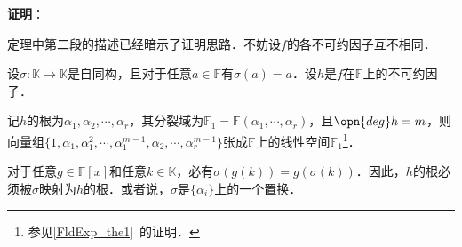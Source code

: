 \textbf{证明}：

定理中第二段的描述已经暗示了证明思路．不妨设$f$的各不可约因子互不相同．

设$\sigma:\mathbb{K}\to\mathbb{K}$是自同构，且对于任意$a\in\mathbb{F}$有$\sigma(a)=a$．设$h$是$f$在$\mathbb{F}$上的不可约因子．

记$h$的根为$\alpha_1, \alpha_2, \cdots, \alpha_r$，其分裂域为$\mathbb{F}_1=\mathbb{F}(\alpha_1,\cdots,\alpha_r)$，且$\opn{deg}h=m$，则向量组$\{1, \alpha_1, \alpha_1^2, \cdots, \alpha_1^{m-1}, \alpha_2, \cdots, \alpha_r^{m-1}\}$张成$\mathbb{F}$上的线性空间$\mathbb{F}_1$\footnote{参见\autoref{FldExp_the1}~的证明．}．

对于任意$g\in\mathbb{F}[x]$和任意$k\in\mathbb{K}$，必有$\sigma(g(k))=g(\sigma(k))$．因此，$h$的根必须被$\sigma$映射为$h$的根．或者说，$\sigma$是$\{\alpha_i\}$上的一个置换．







